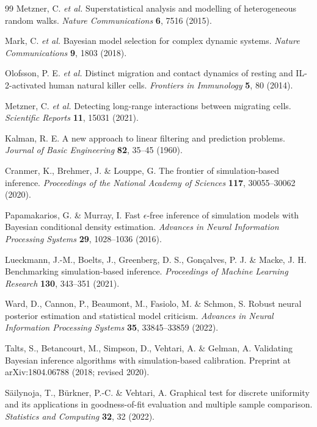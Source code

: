\documentclass[12pt]{article}
\begin{document}
\begin{thebibliography}{99}
Metzner, C. \textit{et al.} Superstatistical analysis and modelling of
heterogeneous random walks. \textit{Nature Communications} \textbf{6},
7516 (2015).

Mark, C. \textit{et al.} Bayesian model selection for complex dynamic systems.
\textit{Nature Communications} \textbf{9}, 1803 (2018).

Olofsson, P. E. \textit{et al.} Distinct migration and contact dynamics of
resting and IL-2-activated human natural killer cells.
\textit{Frontiers in Immunology} \textbf{5}, 80 (2014).

Metzner, C. \textit{et al.} Detecting long-range interactions between migrating
cells. \textit{Scientific Reports} \textbf{11}, 15031 (2021).

Kalman, R. E. A new approach to linear filtering and prediction problems.
\textit{Journal of Basic Engineering} \textbf{82}, 35--45 (1960).

Cranmer, K., Brehmer, J. \& Louppe, G. The frontier of simulation-based
inference. \textit{Proceedings of the National Academy of Sciences}
\textbf{117}, 30055--30062 (2020).

Papamakarios, G. \& Murray, I. Fast $\epsilon$-free inference of simulation
models with Bayesian conditional density estimation.
\textit{Advances in Neural Information Processing Systems} \textbf{29},
1028--1036 (2016).

Lueckmann, J.-M., Boelts, J., Greenberg, D. S., Gon{\c c}alves, P. J.
\& Macke, J. H. Benchmarking simulation-based inference.
\textit{Proceedings of Machine Learning Research} \textbf{130},
343--351 (2021).

Ward, D., Cannon, P., Beaumont, M., Fasiolo, M. \& Schmon, S.
Robust neural posterior estimation and statistical model criticism.
\textit{Advances in Neural Information Processing Systems} \textbf{35},
33845--33859 (2022).

Talts, S., Betancourt, M., Simpson, D., Vehtari, A. \& Gelman, A.
Validating Bayesian inference algorithms with simulation-based calibration.
Preprint at arXiv:1804.06788 (2018; revised 2020).

S{\"a}ilynoja, T., B{\"u}rkner, P.-C. \& Vehtari, A.
Graphical test for discrete uniformity and its applications in goodness-of-fit
evaluation and multiple sample comparison.
\textit{Statistics and Computing} \textbf{32}, 32 (2022).


\end{thebibliography}
\end{document}
